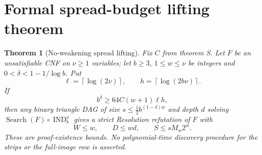 \documentclass[11pt]{article}
\newtheorem{theorem}{Theorem}
\newcommand{\IND}{\operatorname{IND}}
\newcommand{\ceil}[1]{\left\lceil #1\right\rceil}
\begin{document}
\section{Formal spread-budget lifting theorem}\label{sec:lift}
\begin{theorem}[No-weakening spread lifting]\label{thm:lift}
Fix $C$ from theorem S. Let $F$ be an unsatisfiable CNF on $\nu\ge1$
variables; let $b\ge3$, $1\le w\le\nu$ be integers and
$0<\delta<1-1/\log b$. Put
\[
 \ell=\ceil{\log(2\nu)},\qquad h=\ceil{\log(2b\nu)}.
\]
If
\[
             b^\delta\ge64C(w+1)\ell h,                 \tag{7}
\]
then any binary triangle DAG of size $s\le\tfrac12b^{(1-\delta)w}$ and
depth $d$ solving $\operatorname{Search}(F)\circ\IND_b^\nu$ gives a
strict Resolution refutation of $F$ with
\[
 W\le w,\qquad D\le wd,\qquad S\le s M_w2^w.            \tag{8}
\]
These are proof-existence bounds. No polynomial-time discovery procedure for
the strips or the full-image row is asserted.
\end{theorem}
\end{document}
